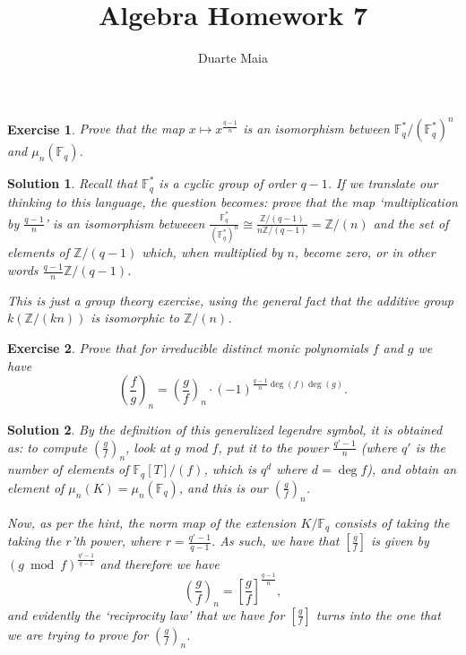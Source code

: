 \documentclass{article}
\title{Algebra Homework 7}
\author{Duarte Maia}
\newtheorem{ex}{Exercise}
\theoremstyle{nonumberplain}
\newtheorem{sol}{Solution}
\newcommand{\Z}{\mathbb{Z}}
\newcommand{\FF}{\mathbb{F}}
\newcommand{\legendre}[2]{\genfrac{(}{)}{}{}{#1}{#2}}
\newcommand{\nlegendre}[3]{\legendre{#1}{#2}_{\!\!#3}}
\newcommand{\blegendre}[2]{\genfrac{[}{]}{}{}{#1}{#2}}
\begin{document}
\maketitle

\setcounter{ex}{42}

\begin{ex}
Prove that the map $x \mapsto x^{\frac{q-1}n}$ is an isomorphism between $\FF_q^* / (\FF_q^*)^n$ and $\mu_n(\FF_q)$.
\end{ex}

\begin{sol}
Recall that $\FF_q^*$ is a cyclic group of order $q-1$. If we translate our thinking to this language, the question becomes: prove that the map `multiplication by $\frac{q-1}n$' is an isomorphism betweeen $\frac{\FF_q^*}{(\FF_q^*)^n} \cong \frac{\Z/(q-1)}{n \Z/(q-1)} = \Z/(n)$ and  the set of elements of $\Z/(q-1)$ which, when multiplied by $n$, become zero, or in other words $\frac{q-1}n \Z/(q-1)$.

This is just a group theory exercise, using the general fact that the additive group $k (\Z/(kn))$ is isomorphic to $\Z/(n)$.
\end{sol}

\begin{ex}
Prove that for irreducible distinct monic polynomials $f$ and $g$ we have
\begin{equation}
\nlegendre fgn = \nlegendre gfn \cdot (-1)^{\frac{q-1}n \deg(f) \deg(g)}.
\end{equation}
\end{ex}

\begin{sol}
By the definition of this generalized legendre symbol, it is obtained as: to compute $\nlegendre gfn$, look at $g$ mod $f$, put it to the power $\frac{q'-1}n$ (where $q'$ is the number of elements of $\FF_q[T]/(f)$, which is $q^d$ where $d = \deg f$), and obtain an element of $\mu_n(K) = \mu_n(\FF_q)$, and this is our $\nlegendre gfn$.

Now, as per the hint, the norm map of the extension $K/\FF_q$ consists of taking the taking the $r$'th power, where $r = \frac{q'-1}{q-1}$. As such, we have that $\blegendre gf$ is given by $(g \bmod f)^{\frac{q'-1}{q-1}}$ and therefore we have
\begin{equation}
\nlegendre gfn = \blegendre gf ^{\frac{q-1}n},
\end{equation}
and evidently the `reciprocity law' that we have for $\blegendre gf$ turns into the one that we are trying to prove for $\nlegendre gfn$.
\end{sol}
\end{document}
